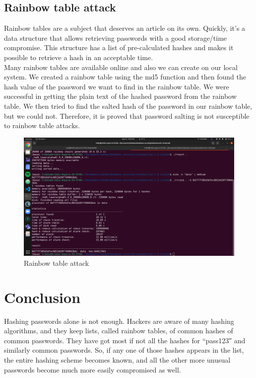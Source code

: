 \documentclass{article}[12pt,a4paper]
\begin{document}
\subsection{Rainbow table attack}
Rainbow tables are a subject that deserves an article on its own. Quickly, it’s a data structure that allows retrieving passwords with a good storage/time compromise. This structure has a list of pre-calculated hashes and makes it possible to retrieve a hash in an acceptable time. \\
Many rainbow tables are available online and also we can create on our local system.
We created a rainbow table using the md5 function and then found the hash value of the password we want to find in the rainbow table. We were successful in getting the plain text of the hashed password from the rainbow table. We then tried to find the salted hash of the password in our rainbow table, but we could not. Therefore, it is proved that password salting is not susceptible to rainbow table attacks.
\begin{figure}[hbt!]
        \centering
        \includegraphics[scale=0.2]{rainbow.png}
        \caption{Rainbow table attack}
\end{figure}
\newpage
\section{Conclusion}
Hashing passwords alone is
not enough. Hackers are aware of many hashing algorithms, and they keep lists, called rainbow tables, of common hashes of common passwords. They have got most if not all the hashes for “pass123″ and similarly common passwords. So, if any one of those hashes appears in the list, the entire hashing scheme becomes known, and all the other more unusual passwords become much more easily compromised as well.
\end{document}
